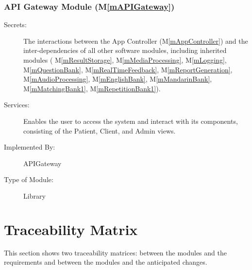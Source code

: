\documentclass[12pt, titlepage]{article}
\newcommand{\mref}[1]{M\ref{#1}}
\begin{document}
    \subsubsection{API Gateway Module (\mref{mAPIGateway})}
  
    \begin{description}
      \item[Secrets:]The interactions between the App Controller (\mref{mAppController}) and the inter-dependencies of all other software modules, including inherited modules (
      \mref{mResultStorage},
      \mref{mMediaProcessing},
      \mref{mLogging},
      \mref{mQuestionBank},
      \mref{mRealTimeFeedback},
      \mref{mReportGeneration},
      \mref{mAudioProcessing},
      \mref{mEnglishBank},
      \mref{mMandarinBank},
      \mref{mMatchingBank1},
      \mref{mRepetitionBank1}).
      \item[Services:]Enables the user to access the system and interact with its components, consisting of the Patient, Client, and Admin views.
      \item[Implemented By:] APIGateway
      \item[Type of Module:] Library
      \end{description}

\section{Traceability Matrix} \label{SecTM}

This section shows two traceability matrices: between the modules and the
requirements and between the modules and the anticipated changes.
\end{document}
